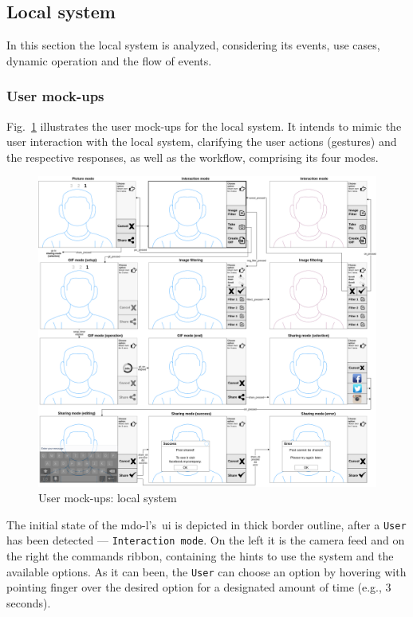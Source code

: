 %
\subsection{Local system}
\label{sec:local-system}
In this section the local system is analyzed, considering its events, use cases,
dynamic operation and the flow of events.
%
\subsubsection{User mock-ups}
\label{sec:user-mockups}
Fig.~\ref{fig:user-mockups-local} illustrates the user mock-ups for the local
system. It intends to mimic the user interaction with the local system,
clarifying the user actions (gestures) and the respective responses, as well as
the workflow, comprising its four modes.
%
\begin{figure}[htb!]
\centering
    \includegraphics[width=1.0\columnwidth]{./img/user-mockups-local.png}
  \caption{User mock-ups: local system}%
\label{fig:user-mockups-local}
\end{figure}

The initial state of the \gls{mdo-l}'s~\gls{ui} is depicted in thick border
outline, after a \texttt{User} has been detected --- \texttt{Interaction
  mode}. On the left it is the camera feed and on the right the commands ribbon,
containing the hints to use the system and the available options. As it can
been, the \texttt{User} can choose an option by hovering with pointing finger
over the desired option for a designated amount of time (e.g., 3 seconds).

